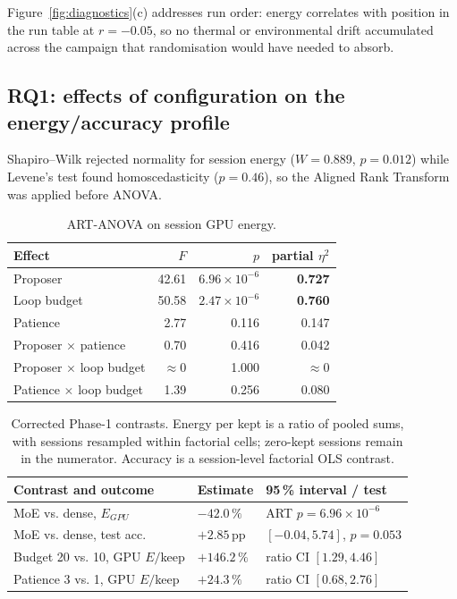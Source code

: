 Figure~\ref{fig:diagnostics}(c) addresses run order: energy correlates with
position in the run table at $r = -0.05$, so no thermal or environmental drift
accumulated across the campaign that randomisation would have needed to absorb.

\subsection{RQ1: effects of configuration on the energy/accuracy profile}

Shapiro--Wilk rejected normality for session energy ($W=0.889$, $p=0.012$) while
Levene's test found homoscedasticity ($p=0.46$), so the Aligned Rank Transform
was applied before ANOVA.

\begin{table}[htbp]
\centering
\caption{ART-ANOVA on session GPU energy.}
\label{tab:anova}
\begin{tabular}{lrrr}
\toprule
Effect & $F$ & $p$ & partial $\eta^2$ \\
\midrule
Proposer            & 42.61 & $6.96\times10^{-6}$ & \textbf{0.727} \\
Loop budget         & 50.58 & $2.47\times10^{-6}$ & \textbf{0.760} \\
Patience            &  2.77 & 0.116 & 0.147 \\
Proposer $\times$ patience     & 0.70 & 0.416 & 0.042 \\
Proposer $\times$ loop budget  & $\approx$0 & 1.000 & $\approx$0 \\
Patience $\times$ loop budget  & 1.39 & 0.256 & 0.080 \\
\bottomrule
\end{tabular}
\end{table}

\begin{table}[htbp]
\centering
\caption{Corrected Phase-1 contrasts. Energy per kept is a ratio of pooled sums,
with sessions resampled within factorial cells; zero-kept sessions remain in the
numerator. Accuracy is a session-level factorial OLS contrast.}
\label{tab:contrasts}
\small
\begin{tabular}{lll}
\toprule
Contrast and outcome & Estimate & 95\,\% interval / test \\
\midrule
MoE vs. dense, $E_{\mathit{GPU}}$ & $-42.0\,\%$ & ART $p=6.96\!\times\!10^{-6}$ \\
MoE vs. dense, test acc. & $+2.85$\,pp & $[-0.04,5.74]$, $p=0.053$ \\
Budget 20 vs. 10, GPU $E/$keep & $+146.2\,\%$ & ratio CI $[1.29,4.46]$ \\
Patience 3 vs. 1, GPU $E/$keep & $+24.3\,\%$ & ratio CI $[0.68,2.76]$ \\
\bottomrule
\end{tabular}
\end{table}


